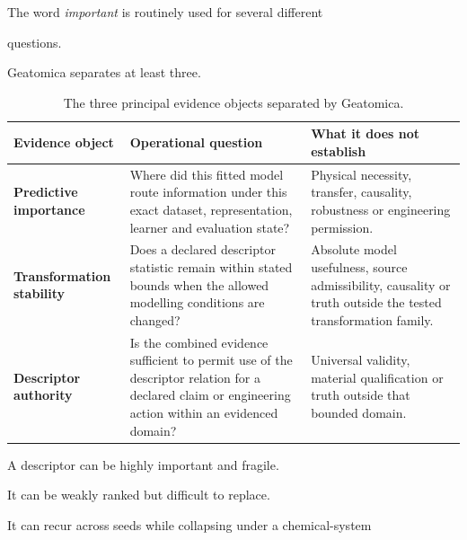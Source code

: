\documentclass[11pt,a4paper,oneside]{report}
\providecommand{\term}[1]{\textbf{#1}}
\begin{document}
The word \emph{important} is routinely used for several different

questions.



Geatomica separates at least three.



\begin{table}[H]



\centering



\caption{The three principal evidence objects separated by Geatomica.}



\label{tab:three-evidence-objects}



\begin{tabularx}{\textwidth}{L{0.19\textwidth}
    Y
    Y
}
\toprule
\textbf{Evidence object}
&
\textbf{Operational question}
&
\textbf{What it does not establish}
\\
\midrule
\term{Predictive importance}
&
Where did this fitted model route information under this exact
dataset,
representation,
learner
and evaluation state?
&
Physical necessity,
transfer,
causality,
robustness
or engineering permission.
\\
\addlinespace
\term{Transformation stability}
&
Does a declared descriptor statistic remain within stated bounds when
the allowed modelling conditions are changed?
&
Absolute model usefulness,
source admissibility,
causality
or truth outside the tested transformation family.
\\
\addlinespace
\term{Descriptor authority}
&
Is the combined evidence sufficient to permit use of the descriptor
relation for a declared claim or engineering action within an
evidenced domain?
&
Universal validity,
material qualification
or truth outside that bounded domain.
\\
\bottomrule
\end{tabularx}



\end{table}



A descriptor can be highly important and fragile.



It can be weakly ranked but difficult to replace.



It can recur across seeds while collapsing under a chemical-system
\end{document}
